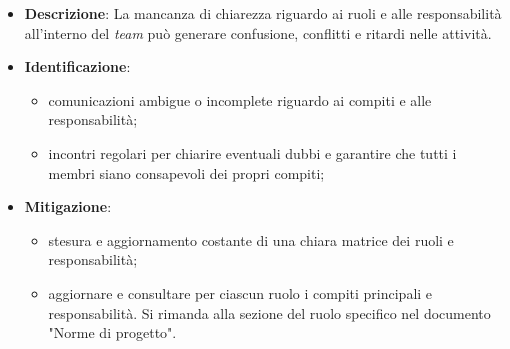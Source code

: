 \label{risk:mancanza di chiarezza nei ruoli e responsabilità}
\begin{itemize}
	\item \textbf{Descrizione}:
			La mancanza di chiarezza riguardo ai ruoli e alle responsabilità 
			all'interno del \textit{team} può generare confusione, conflitti e ritardi 
			nelle attività.

	\item \textbf{Identificazione}:
	      \begin{itemize}
		      \item comunicazioni ambigue o incomplete riguardo ai compiti e alle responsabilità;

		      \item incontri regolari per chiarire eventuali dubbi e garantire che tutti 
			  		i membri siano consapevoli dei propri compiti;
	      \end{itemize}

	\item \textbf{Mitigazione}:
	      \begin{itemize}
		      \item stesura e aggiornamento costante di una chiara matrice dei ruoli e responsabilità;

		      \item aggiornare e consultare per ciascun ruolo i compiti principali e responsabilità.
			  		Si rimanda alla sezione del ruolo specifico nel documento "Norme di progetto".	
	      \end{itemize}
\end{itemize}
